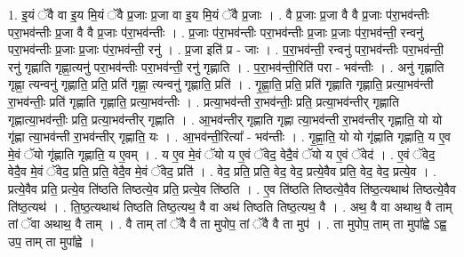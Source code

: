 \documentclass[17pt]{extarticle}
\begin{document}
1. इ॒यं ॅवै वा इ॒य मि॒यं ॅवै प्र॒जाः प्र॒जा वा इ॒य मि॒यं ॅवै प्र॒जाः । . वै प्र॒जाः प्र॒जा वै वै प्र॒जाः प॑रा॒भव॑न्तीः परा॒भव॑न्तीः प्र॒जा वै वै प्र॒जाः प॑रा॒भव॑न्तीः । . प्र॒जाः प॑रा॒भव॑न्तीः परा॒भव॑न्तीः प्र॒जाः प्र॒जाः प॑रा॒भव॑न्ती॒ रन्वनु॑ परा॒भव॑न्तीः प्र॒जाः प्र॒जाः प॑रा॒भव॑न्ती॒ रनु॑ । . प्र॒जा इति॑ प्र - जाः । . प॒रा॒भव॑न्ती॒ रन्वनु॑ परा॒भव॑न्तीः परा॒भव॑न्ती॒ रनु॑ गृह्णाति गृह्णा॒त्यनु॑ परा॒भव॑न्तीः परा॒भव॑न्ती॒ रनु॑ गृह्णाति । . प॒रा॒भव॑न्ती॒रिति॑ परा - भव॑न्तीः । . अनु॑ गृह्णाति गृह्णा॒ त्यन्वनु॑ गृह्णाति॒ प्रति॒ प्रति॑ गृह्णा॒ त्यन्वनु॑ गृह्णाति॒ प्रति॑ । . गृ॒ह्णा॒ति॒ प्रति॒ प्रति॑ गृह्णाति गृह्णाति॒ प्रत्या॒भव॑न्ती रा॒भव॑न्तीः॒ प्रति॑ गृह्णाति गृह्णाति॒ प्रत्या॒भव॑न्तीः । . प्रत्या॒भव॑न्ती रा॒भव॑न्तीः॒ प्रति॒ प्रत्या॒भव॑न्तीर् गृह्णाति गृह्णात्या॒भव॑न्तीः॒ प्रति॒ प्रत्या॒भव॑न्तीर् गृह्णाति । . आ॒भव॑न्तीर् गृह्णाति गृह्णा त्या॒भव॑न्ती रा॒भव॑न्तीर् गृह्णाति॒ यो यो गृ॑ह्णा त्या॒भव॑न्ती रा॒भव॑न्तीर् गृह्णाति॒ यः । . आ॒भव॑न्ती॒रित्या᳚ - भव॑न्तीः । . गृ॒ह्णा॒ति॒ यो यो गृ॑ह्णाति गृह्णाति॒ य ए॒व मे॒वं ॅयो गृ॑ह्णाति गृह्णाति॒ य ए॒वम् । . य ए॒व मे॒वं ॅयो य ए॒वं ॅवेद॒ वेदै॒वं ॅयो य ए॒वं ॅवेद॑ । . ए॒वं ॅवेद॒ वेदै॒व मे॒वं ॅवेद॒ प्रति॒ प्रति॒ वेदै॒व मे॒वं ॅवेद॒ प्रति॑ । . वेद॒ प्रति॒ प्रति॒ वेद॒ वेद॒ प्रत्ये॒वैव प्रति॒ वेद॒ वेद॒ प्रत्ये॒व । . प्रत्ये॒वैव प्रति॒ प्रत्ये॒व ति॑ष्ठति तिष्ठत्ये॒व प्रति॒ प्रत्ये॒व ति॑ष्ठति । . ए॒व ति॑ष्ठति तिष्ठत्ये॒वैव ति॑ष्ठ॒त्यथाथ॑ तिष्ठत्ये॒वैव ति॑ष्ठ॒त्यथ॑ । . ति॒ष्ठ॒त्यथाथ॑ तिष्ठति तिष्ठ॒त्यथ॒ वै वा अथ॑ तिष्ठति तिष्ठ॒त्यथ॒ वै । . अथ॒ वै वा अथाथ॒ वै ताम् तां ॅवा अथाथ॒ वै ताम् । . वै ताम् तां ॅवै वै ता मुपोप॒ तां ॅवै वै ता मुप॑ । . ता मुपोप॒ ताम् ता मुपा᳚ह्वे ऽह्व॒ उप॒ ताम् ता मुपा᳚ह्वे । \newline
\end{document}

